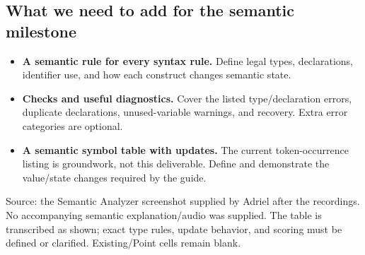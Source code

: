 \documentclass[11pt,a4paper]{article}
\begin{document}
\subsection{What we need to add for the semantic milestone}
\begin{itemize}
\item \textcolor{focus}{\textbf{A semantic rule for every syntax rule.}} Define legal types,
declarations, identifier use, and how each construct changes semantic state.
\item \textcolor{focus}{\textbf{Checks and useful diagnostics.}} Cover the listed type/declaration errors,
duplicate declarations, unused-variable warnings, and recovery. Extra error categories are optional.
\item \textcolor{focus}{\textbf{A semantic symbol table with updates.}} The current token-occurrence listing
is groundwork, not this deliverable. Define and demonstrate the value/state changes required by the guide.
\end{itemize}

{\footnotesize\color{muted}Source: the Semantic Analyzer screenshot supplied by Adriel after the
recordings. No accompanying semantic explanation/audio was supplied. The table is transcribed
as shown; exact type rules, update behavior, and scoring must be defined or clarified.
Existing/Point cells remain blank.}
\end{document}
